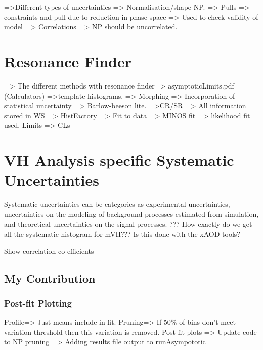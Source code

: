 =>Different types of uncertainties  
=> Normalisation/shape NP. 
=> Pulls => constraints and pull due to reduction in phase space => Used to check validity of model 
=> Correlations => NP should be uncorrelated. 
\section{Resonance Finder}
=> The different methods with resonance finder=> asymptoticLimits.pdf (Calculators)
=>template histograms.  => Morphing 
=> Incorporation of statistical uncertainty => Barlow-beeson lite. 
=>CR/SR
=> All information stored in WS => HistFactory 
=> Fit to data => MINOS fit => likelihood fit used. 
Limits => CLs 
\section{VH Analysis specific Systematic Uncertainties}
Systematic uncertainties can be categories as experimental uncertainties, uncertainties on the modeling of background processes estimated from simulation, and theoretical uncertainties on the signal processes. 
??? How exactly do we get all the systematic histogram for mVH??? Is this done with the xAOD tools? 

Show correlation co-efficients 

\subsection{My Contribution}
\subsubsection{Post-fit Plotting}
Profile=> Just means include in fit. 
Pruning=>  If 50\% of bins don't meet variation threshold then this variation is removed. 
Post fit plots =>  Update code to 
NP pruning => 
Adding results file output to runAsympototic


